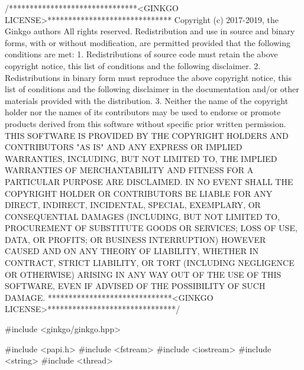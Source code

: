 \begin{DoxyCodeInclude}
\textcolor{comment}{/*******************************<GINKGO LICENSE>******************************}
\textcolor{comment}{Copyright (c) 2017-2019, the Ginkgo authors}
\textcolor{comment}{All rights reserved.}
\textcolor{comment}{}
\textcolor{comment}{Redistribution and use in source and binary forms, with or without}
\textcolor{comment}{modification, are permitted provided that the following conditions}
\textcolor{comment}{are met:}
\textcolor{comment}{}
\textcolor{comment}{1. Redistributions of source code must retain the above copyright}
\textcolor{comment}{notice, this list of conditions and the following disclaimer.}
\textcolor{comment}{}
\textcolor{comment}{2. Redistributions in binary form must reproduce the above copyright}
\textcolor{comment}{notice, this list of conditions and the following disclaimer in the}
\textcolor{comment}{documentation and/or other materials provided with the distribution.}
\textcolor{comment}{}
\textcolor{comment}{3. Neither the name of the copyright holder nor the names of its}
\textcolor{comment}{contributors may be used to endorse or promote products derived from}
\textcolor{comment}{this software without specific prior written permission.}
\textcolor{comment}{}
\textcolor{comment}{THIS SOFTWARE IS PROVIDED BY THE COPYRIGHT HOLDERS AND CONTRIBUTORS "AS}
\textcolor{comment}{IS" AND ANY EXPRESS OR IMPLIED WARRANTIES, INCLUDING, BUT NOT LIMITED}
\textcolor{comment}{TO, THE IMPLIED WARRANTIES OF MERCHANTABILITY AND FITNESS FOR A}
\textcolor{comment}{PARTICULAR PURPOSE ARE DISCLAIMED. IN NO EVENT SHALL THE COPYRIGHT}
\textcolor{comment}{HOLDER OR CONTRIBUTORS BE LIABLE FOR ANY DIRECT, INDIRECT, INCIDENTAL,}
\textcolor{comment}{SPECIAL, EXEMPLARY, OR CONSEQUENTIAL DAMAGES (INCLUDING, BUT NOT}
\textcolor{comment}{LIMITED TO, PROCUREMENT OF SUBSTITUTE GOODS OR SERVICES; LOSS OF USE,}
\textcolor{comment}{DATA, OR PROFITS; OR BUSINESS INTERRUPTION) HOWEVER CAUSED AND ON ANY}
\textcolor{comment}{THEORY OF LIABILITY, WHETHER IN CONTRACT, STRICT LIABILITY, OR TORT}
\textcolor{comment}{(INCLUDING NEGLIGENCE OR OTHERWISE) ARISING IN ANY WAY OUT OF THE USE}
\textcolor{comment}{OF THIS SOFTWARE, EVEN IF ADVISED OF THE POSSIBILITY OF SUCH DAMAGE.}
\textcolor{comment}{******************************<GINKGO LICENSE>*******************************/}

\textcolor{preprocessor}{#include <ginkgo/ginkgo.hpp>}


\textcolor{preprocessor}{#include <papi.h>}
\textcolor{preprocessor}{#include <fstream>}
\textcolor{preprocessor}{#include <iostream>}
\textcolor{preprocessor}{#include <string>}
\textcolor{preprocessor}{#include <thread>}



\end{DoxyCodeInclude}
